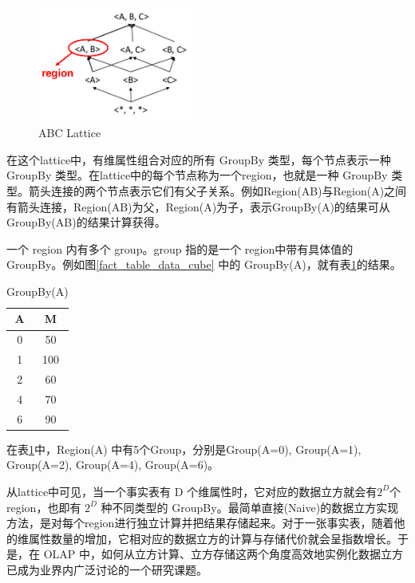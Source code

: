 \begin{figure}[!htb]
\centering\includegraphics[width=2in]{picture/ch_preliminary/abc_lattice} 
\caption{ABC Lattice}\label{abc_lattice} 
\end{figure} 

在这个lattice中，有维属性组合对应的所有 GroupBy 类型，每个节点表示一种 GroupBy 类型。在lattice中的每个节点称为一个region，也就是一种 GroupBy 类型。箭头连接的两个节点表示它们有父子关系。例如Region(AB)与Region(A)之间有箭头连接，Region(AB)为父，Region(A)为子，表示GroupBy(A)的结果可从GroupBy(AB)的结果计算获得。

一个 region 内有多个 group。group 指的是一个
region中带有具体值的 GroupBy。例如图\ref{fact_table_data_cube} 中的 GroupBy(A)，就有表\ref{groupby_a_table}的结果。

\begin{table}[!ht]
\begin{center}
\begin{tabular}{|c|c|}
\hline 
A & M \\ 
\hline 
0 & 50 \\ 
\hline 
1 & 100 \\ 
\hline 
2 & 60 \\ 
\hline 
4 & 70 \\ 
\hline 
6 & 90 \\ 
\hline 
\end{tabular} 
\end{center}
\caption{GroupBy(A)}\label{groupby_a_table}
\end{table}

在表\ref{groupby_a_table}中，Region(A) 中有5个Group，分别是Group(A=0), Group(A=1), Group(A=2), Group(A=4), Group(A=6)。

从lattice中可见，当一个事实表有 D 个维属性时，它对应的数据立方就会有${2}^{D}$个region，也即有 ${2}^{D}$ 种不同类型的 GroupBy。最简单直接(Naive)的数据立方实现方法，是对每个region进行独立计算并把结果存储起来。对于一张事实表，随着他的维属性数量的增加，它相对应的数据立方的计算与存储代价就会呈指数增长。于是，在 OLAP 中，如何从立方计算、立方存储这两个角度高效地实例化数据立方已成为业界内广泛讨论的一个研究课题。


